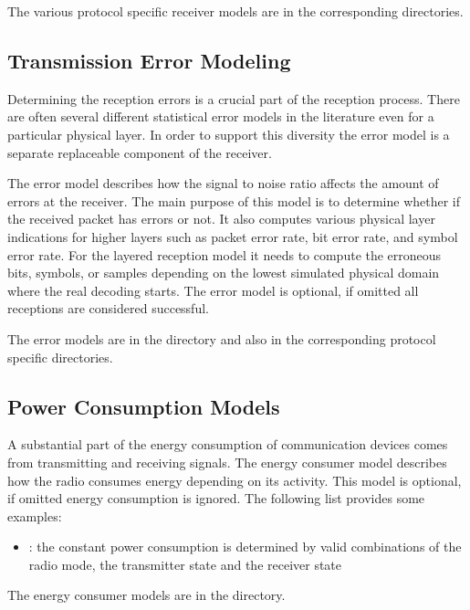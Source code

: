 The various protocol specific receiver models are in the corresponding
directories.

\subsection{Transmission Error Modeling}

Determining the reception errors is a crucial part of the reception process.
There are often several different statistical error models in the literature
even for a particular physical layer. In order to support this diversity the
error model is a separate replaceable component of the receiver.

The error model describes how the signal to noise ratio affects the amount of
errors at the receiver. The main purpose of this model is to determine whether
if the received packet has errors or not. It also computes various physical
layer indications for higher layers such as packet error rate, bit error rate,
and symbol error rate. For the layered reception model it needs to compute the
erroneous bits, symbols, or samples depending on the lowest simulated physical
domain where the real decoding starts. The error model is optional, if omitted
all receptions are considered successful.

The error models are in the  directory and
also in the corresponding protocol specific directories.

\subsection{Power Consumption Models}

A substantial part of the energy consumption of communication devices comes from
transmitting and receiving signals. The energy consumer model describes how the
radio consumes energy depending on its activity. This model is optional, if
omitted energy consumption is ignored. The following list provides some examples:

\begin{itemize}
  \item {}: the constant power consumption is
determined by valid combinations of the radio mode, the transmitter state and
the receiver state
\end{itemize}

The energy consumer models are in the  directory.

